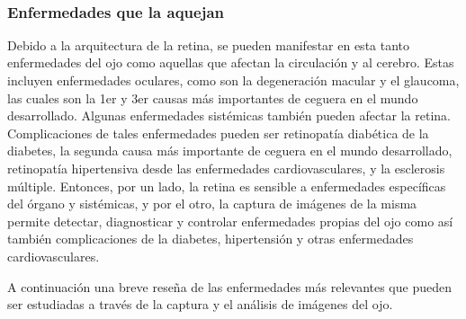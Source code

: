  






\\

			\subsubsection{Enfermedades que la aquejan}
			
Debido a la arquitectura de la retina, se pueden manifestar en esta tanto enfermedades del ojo como aquellas que afectan la circulación y al cerebro. Estas incluyen enfermedades oculares, como son la degeneración macular y el glaucoma, las cuales son la 1er y 3er causas más importantes de ceguera en el mundo desarrollado. Algunas enfermedades sistémicas también pueden afectar la retina. Complicaciones de tales enfermedades pueden ser retinopatía diabética de la diabetes, la segunda causa más importante de ceguera en el mundo desarrollado, retinopatía hipertensiva desde las enfermedades cardiovasculares, y la esclerosis múltiple. Entonces, por un lado, la retina es sensible a enfermedades específicas del órgano y sistémicas, y por el otro, la captura de imágenes de la misma permite detectar, diagnosticar y controlar enfermedades propias del ojo como así también complicaciones de la diabetes, hipertensión y otras enfermedades cardiovasculares.
			



A continuación una breve reseña de las enfermedades más relevantes que pueden ser estudiadas a través de la captura y el análisis de imágenes del ojo.

